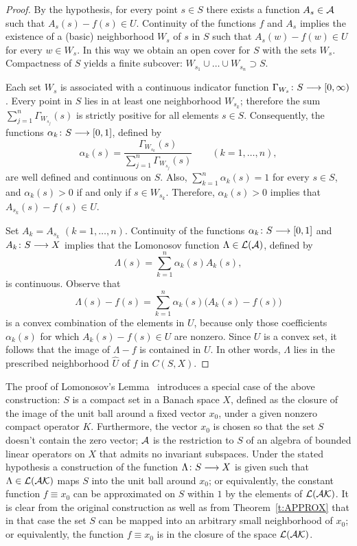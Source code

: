 \begin{proof}
By the hypothesis, for every point $s\in{S}$ there exists a
function $A_s\in{\cal A}$ such that $A_s(s)-f(s)\in{U}$. Continuity
of the functions $f$ and $A_s$ implies the existence of a
(basic) neighborhood $W_s$ of $s$ in $S$ such that
$A_s(w)-f(w)\in{U}$ for every $w\in{W_s}$. In this way we
obtain an open cover for $S$ with the sets $W_s$. Compactness
of $S$ yields a finite subcover:
$W_{s_1}\cup\ldots\cup{W_{s_n}}\supset{S}$.

\smallskip

Each set $W_s$ is associated with a continuous indicator
function $\Gamma_{W_s}\colon S \longrightarrow [0,\infty)$. Every point in $S$
lies in at least one neighborhood $W_{s_k}$; therefore the sum
$\sum_{j=1}^n \Gamma_{W_{s_j}}(s)$ is strictly positive for all
elements $s \in S$. Consequently, the functions $\alpha_k\colon
S \longrightarrow [0,1]$, defined by
\[ \alpha_k(s) =
   \frac{\Gamma_{W_{s_k}}(s)}{\sum_{j=1}^n \Gamma_{W_{s_j}}(s)}
   \quad\quad   (k=1,\ldots,n), \]
are well defined and continuous on $S$. Also,
$\sum_{k=1}^n\alpha_k(s)=1$ for every $s \in S$, and
$\alpha_k(s)>0$ if and only if $s \in W_{s_k}$. Therefore,
$\alpha_k(s)>0$ implies that $A_{s_k}(s)-f(s)\in{U}$.

Set $A_k=A_{s_k}$ $(k=1,\ldots,n)$. Continuity of the functions
$\alpha_k\colon S\longrightarrow[0,1]$ and $A_k\colon S \longrightarrow X$ implies that
the Lomonosov function $\Lambda\in\cal{L}({\cal A})$, defined by
\[ \Lambda(s) = \sum_{k=1}^n \alpha_k(s) A_k(s), \]
is continuous. Observe that
\[ \Lambda(s) - f(s) = \sum_{k=1}^n \alpha_k(s)
       \big(A_k(s)-f(s)\big) \]
is a convex combination of the elements in $U$, because only
those coefficients $\alpha_k(s)$ for which $A_k(s)-f(s)\in{U}$
are nonzero. Since $U$ is a convex set, it follows that the
image of $\Lambda-f$ is contained in $U$. In other words,
$\Lambda$ lies in the prescribed neighborhood $\widehat{U}$ of
$f$ in $C(S,X)$.
\end{proof}

\smallskip

\begin{rem}
The proof of Lomonosov's Lemma~\cite{Lom73,RR73} introduces a
special case of the above construction: $S$ is a compact set in
a Banach space $X$, defined as the closure of the image of the
unit ball around a fixed vector $x_0$, under a given nonzero
compact operator $K$. Furthermore, the vector $x_0$ is chosen
so that the set $S$ doesn't contain the zero vector; ${\cal A}$ is
the restriction to $S$ of an algebra of bounded linear
operators on $X$ that admits no invariant subspaces. Under the
stated hypothesis a construction of the function
$\Lambda\colon{S}\longrightarrow{X}$ is given such that
$\Lambda\in\cal{L}({\cal A}{K})$ maps $S$ into the unit ball around
$x_0$; or equivalently, the constant function $f\equiv{x_0}$
can be approximated on $S$ within $1$ by the elements of
$\cal{L}({\cal A}{K})$. It is clear from the original construction as
well as from Theorem~\ref{t:APPROX} that in that case the set
$S$ can be mapped into an arbitrary small neighborhood of
$x_0$; or equivalently, the function $f\equiv{x_0}$ is in the
closure of the space $\cal{L}({\cal A}{K})$.
\end{rem}


